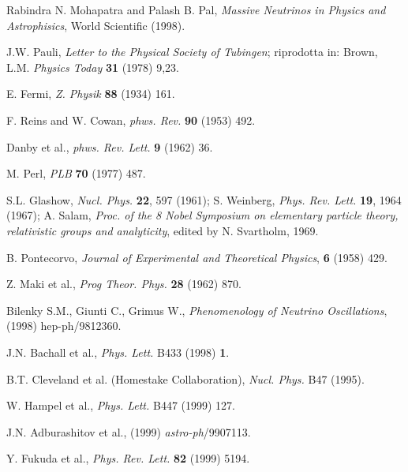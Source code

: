 
\begin{thebibliography}{99}

\baselineskip=15.5pt


 Rabindra N. Mohapatra and Palash B. Pal, \emph{Massive Neutrinos in Physics and Astrophisics}, World Scientific (1998).

 J.W. Pauli, \emph{Letter to the Physical Society of Tubingen}; riprodotta in: Brown, L.M. \emph{Physics Today} \textbf{31} (1978) 9,23.

 E. Fermi, \emph{Z. Physik} \textbf{88} (1934) 161.

 F. Reins and W. Cowan, \emph{phws. Rev.} \textbf{90} (1953) 492.

 Danby et al., \emph{phws. Rev. Lett.} \textbf{9} (1962) 36.

 M. Perl, \emph{PLB} \textbf{70} (1977) 487.

 S.L. Glashow, \emph{Nucl. Phys.} \textbf{22}, 597 (1961); S. Weinberg, \emph{Phys. Rev. Lett.} \textbf{19}, 1964 (1967); 
A. Salam, \emph{Proc. of the 8 Nobel Symposium on elementary particle theory, relativistic groups and analyticity}, edited by N. Svartholm, 1969.

 B. Pontecorvo, \emph{Journal of Experimental and Theoretical Physics}, \textbf{6} (1958) 429.

 Z. Maki et al., \emph{Prog Theor. Phys.} \textbf{28} (1962) 870.

 Bilenky S.M., Giunti C., Grimus W., \emph{Phenomenology of Neutrino Oscillations}, (1998) hep-ph/9812360.

 J.N. Bachall et al., \emph{Phys. Lett.} B433 (1998) \textbf{1}.

 B.T. Cleveland et al. (Homestake Collaboration), \emph{Nucl. Phys.} B47 (1995).

 W. Hampel et al., \emph{Phys. Lett.} B447 (1999) 127.

 J.N. Adburashitov et al., (1999) \emph{astro-ph}/9907113.

 Y. Fukuda et al., \emph{Phys. Rev. Lett.} \textbf{82} (1999) 5194.


\end{thebibliography}
